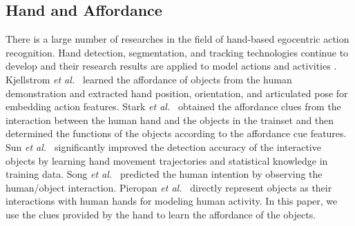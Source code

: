 \documentclass[journal,twoside]{IEEEtran}
\def\etal{{\em et al.~}}
\begin{document}
\subsection{Hand and Affordance}
There is a large number of researches in the field of hand-based egocentric action recognition. Hand detection, segmentation, and tracking technologies \cite{DBLP:conf/cvpr/LiK13,DBLP:conf/cvpr/Betancourt14,DBLP:journals/cviu/BetancourtMBMRR17} continue to develop and their research results are applied to model actions and activities \cite{DBLP:conf/iccv/BambachLCY15,9060114}. Kjellstrom \etal \cite{DBLP:journals/cviu/KjellstromRK11} learned the affordance of objects from the human demonstration and extracted hand position, orientation, and articulated pose for embedding action features. Stark \etal \cite{DBLP:conf/icvs/StarkLZWS08} obtained the affordance clues from the interaction between the human hand and the objects in the trainset and then determined the functions of the objects according to the affordance cue features. Sun \etal \cite{DBLP:journals/ras/0004RL14} significantly improved the detection accuracy of the interactive objects by learning hand movement trajectories and statistical knowledge in training data. Song \etal \cite{DBLP:conf/icra/SongKOPABK13} predicted the human intention by observing the human/object interaction. Pieropan \etal \cite{DBLP:conf/icra/PieropanEK13} directly represent objects as their interactions with human hands for modeling human activity. In this paper, we use the clues provided by the hand to learn the affordance of the objects.
\end{document}
